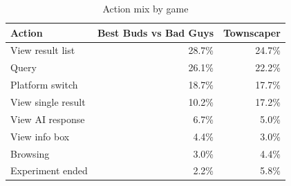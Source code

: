 \begin{table}[t]
\centering
\caption{Action mix by game}
\label{tab:rq1-by-game}
\begin{tabular}{lrr}
\toprule
Action & Best Buds vs Bad Guys & Townscaper \\
\midrule
View result list & 28.7\% & 24.7\% \\
Query & 26.1\% & 22.2\% \\
Platform switch & 18.7\% & 17.7\% \\
View single result & 10.2\% & 17.2\% \\
View AI response & 6.7\% & 5.0\% \\
View info box & 4.4\% & 3.0\% \\
Browsing & 3.0\% & 4.4\% \\
Experiment ended & 2.2\% & 5.8\% \\
\bottomrule
\end{tabular}
\end{table}
